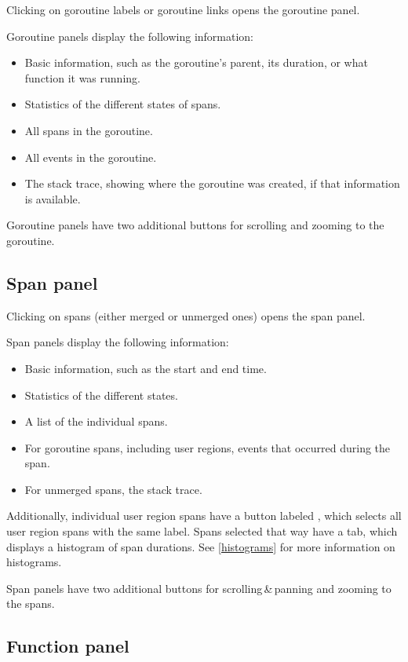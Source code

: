 \documentclass[10pt,letterpaper,oneside,openany,english]{memoir}
\begin{document}
Clicking on goroutine labels or goroutine links opens the goroutine panel.

Goroutine panels display the following information:

\begin{itemize}
\item Basic information, such as the goroutine's parent, its duration, or what function it was running.
\item Statistics of the different states of spans.
\item All spans in the goroutine.
\item All events in the goroutine.
\item The stack trace, showing where the goroutine was created, if that information is available.
\end{itemize}

Goroutine panels have two additional buttons for scrolling and zooming to the goroutine.

\subsection{Span panel}\label{span-panel}

Clicking on spans (either merged or unmerged ones) opens the span panel.

Span panels display the following information:

\begin{itemize}
\item Basic information, such as the start and end time.
\item Statistics of the different states.
\item A list of the individual spans.
\item For goroutine spans, including user regions, events that occurred during the span.
\item For unmerged spans, the stack trace.
\end{itemize}

Additionally, individual user region spans have a button labeled ,
which selects all user region spans with the same label.
Spans selected that way have a  tab, which displays a histogram of span durations.
See \cref{histograms} for more information on histograms.

Span panels have two additional buttons for scrolling\,\&\,panning and zooming to the spans.

\subsection{Function panel}\label{function-panel}
\end{document}
